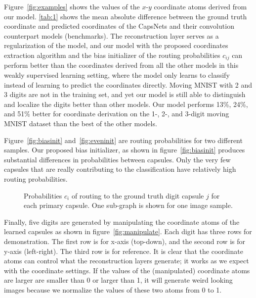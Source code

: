 \documentclass{article}
\begin{document}
Figure~\ref{fig:examples} shows the values of the $x$-$y$ coordinate atoms derived from our model. \autoref{tab:1} shows the mean absolute difference between the ground truth coordinate and predicted coordinates of the CapsNets and their convolution counterpart models (benchmarks). The reconstruction layer serves as a regularization of the model, and our model with the proposed coordinates extraction algorithm and the bias initializer of the routing probabilities $c_{ij}$ can perform better than the coordinates derived from all the other models in this weakly supervised learning setting, where the model only learns to classify instead of learning to predict the coordinates directly. Moving MNIST with 2 and 3 digits are not in the training set, and yet our model is still able to distinguish and localize the digits better than other models. Our model performs 13\%, 24\%, and 51\% better for coordinate derivation on the 1-, 2-, and 3-digit moving MNIST dataset than the best of the other models. 

Figure~\ref{fig:biasinit} and~\ref{fig:eveninit} are routing probabilities for two different samples. Our proposed bias initializer, as shown in figure~\ref{fig:biasinit} produces substantial differences in probabilities between capsules. Only the very few capsules that are really contributing to the classification have relatively high routing probabilities. 

\begin{figure} 
\centering
{}
\caption{Probabilities $c_{i}$ of routing to the ground truth digit capsule $j$ for each primary capsule. One sub-graph is shown for one image sample.}
\end{figure}

Finally, five digits are generated by manipulating the coordinate atoms of the learned capsules as shown in figure~\ref{fig:manipulate}. Each digit has three rows for demonstration. The first row is for x-axis (top-down), and the second row is for y-axis (left-right). The third row is for reference. It is clear that the coordinate atoms can control what the reconstruction layers generate; it works as we expect with the coordinate settings. If the values of the (manipulated) coordinate atoms are larger are smaller than 0 or larger than 1, it will generate weird looking images because we normalize the values of these two atoms from 0 to 1. 
\end{document}
